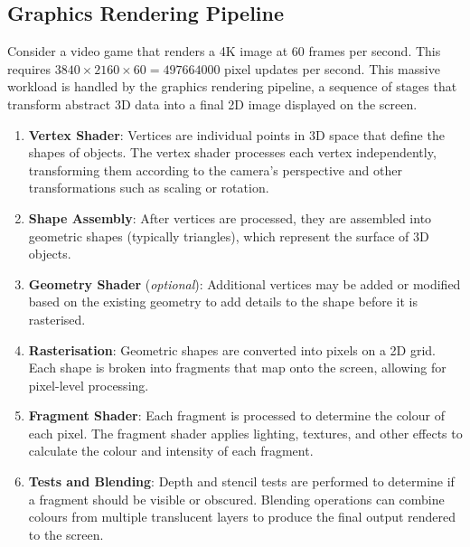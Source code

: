 \documentclass{article}
\begin{document}
\subsection{Graphics Rendering Pipeline}
Consider a video game that renders a 4K image at 60 frames per second.
This requires \(3840 \times 2160 \times 60 = \num{497664000}\) pixel
updates per second. This massive workload is handled by the graphics
rendering pipeline, a sequence of stages that transform abstract 3D
data into a final 2D image displayed on the screen.
\begin{enumerate}
    \item \textbf{Vertex Shader}: Vertices are individual points in 3D
          space that define the shapes of objects. The vertex shader processes
          each vertex independently, transforming them according to the
          camera's perspective and other transformations such as scaling
          or rotation.
    \item \textbf{Shape Assembly}: After vertices are processed, they
          are assembled into geometric shapes (typically triangles),
          which represent the surface of 3D objects.
    \item \textbf{Geometry Shader} (\textit{optional}): Additional
          vertices may be added or modified based on the existing geometry to
          add details to the shape before it is rasterised.
    \item \textbf{Rasterisation}: Geometric shapes are converted into
          pixels on a 2D grid. Each shape is broken into fragments that map
          onto the screen, allowing for pixel-level processing.
    \item \textbf{Fragment Shader}: Each fragment is processed to determine
          the colour of each pixel. The fragment shader applies lighting,
          textures, and other effects to calculate the colour and intensity of
          each fragment.
    \item \textbf{Tests and Blending}: Depth and stencil tests are
          performed to determine if a fragment should be visible or obscured.
          Blending operations can combine colours from multiple translucent
          layers to produce the final output rendered to the screen.
\end{enumerate}
\end{document}
